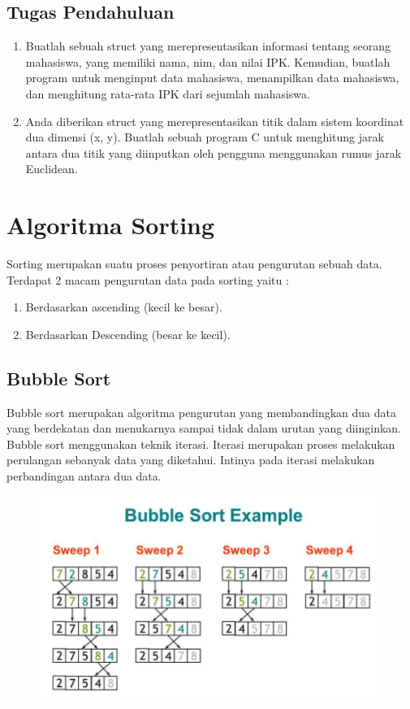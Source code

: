 \subsection{Tugas Pendahuluan}
\begin{enumerate}
    \item Buatlah sebuah struct yang merepresentasikan informasi tentang seorang mahasiswa, yang memiliki nama, nim, dan nilai IPK. Kemudian, buatlah program untuk menginput data mahasiswa, menampilkan data mahasiswa, dan menghitung rata-rata IPK dari sejumlah mahasiswa.
    \item Anda diberikan struct yang merepresentasikan titik dalam sistem koordinat dua dimensi (x, y). Buatlah sebuah program C untuk menghitung jarak antara dua titik yang diinputkan oleh pengguna menggunakan rumus jarak Euclidean.
\end{enumerate}

\section{Algoritma Sorting}
Sorting merupakan suatu proses penyortiran atau pengurutan sebuah data.\\
Terdapat 2 macam pengurutan data pada sorting yaitu :
\begin{enumerate}
    \item Berdasarkan ascending (kecil ke besar).
    \item Berdasarkan Descending (besar ke kecil).
\end{enumerate}

\subsection{Bubble Sort}
Bubble sort merupakan algoritma pengurutan yang membandingkan dua data yang berdekatan dan menukarnya sampai tidak dalam urutan yang diinginkan.
Bubble sort menggunakan teknik iterasi. Iterasi merupakan proses melakukan perulangan sebanyak data yang diketahui.
Intinya pada iterasi melakukan perbandingan antara dua data.

\begin{figure}[H]
    \centering
    \includegraphics[width=0.7\linewidth]{P4/img/screenshot006.png}
    \caption{}
    \label{fig:enam}
\end{figure}

